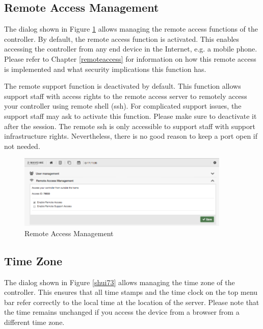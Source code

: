 \subsection{Remote Access Management}


The dialog shown in Figure \ref{shui72} allows managing the remote access functions of 
the controller. By default, the remote access function is activated. This enables accessing 
the controller from any end device in the Internet, e.g. a mobile phone. Please refer 
to Chapter \ref{remoteaccess} for information on how this remote access is implemented 
and what security implications this function has.

The remote support function is deactivated by default. This function allows support 
staff with access rights to the remote access server to remotely access your controller 
using remote shell (ssh). For complicated support issues, the support staff may ask 
to activate this function. Please make sure to deactivate it after the session. The 
remote ssh is only accessible to support staff with support infrastructure rights.
 Nevertheless, there is no good reason to keep a port open if not needed.

\begin{figure}
\begin{center}
\includegraphics[width=0.9\textwidth]{pngs/cap4/shui72.png}
\caption{Remote Access Management}
\label{shui72}
\end{center}
\end{figure}

\subsection{Time Zone}

The dialog shown in Figure \ref{shui73} allows managing the time zone of the controller. 
This ensures that all time stamps and the time clock on the top menu bar refer correctly 
to the local time at the location of the server. Please note that the time remains 
unchanged if you access the device from a browser from a different time zone.


